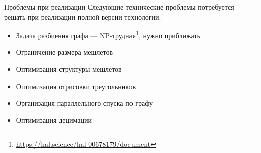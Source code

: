 \begin{frame}{Проблемы при реализации}
    Следующие технические проблемы потребуется решать при реализации полной версии технологии:
    \begin{itemize}
        \item Задача разбиения графа --- NP-трудная\footnote{\url{https://hal.science/hal-00678179/document}}, нужно приближать
        \item Ограничение размера мешлетов
        \item Оптимизация структуры мешлетов
        \item Оптимизация отрисовки треугольников
        \item Организация параллельного спуска по графу
        \item Оптимизация децимации
    \end{itemize}
\end{frame}
